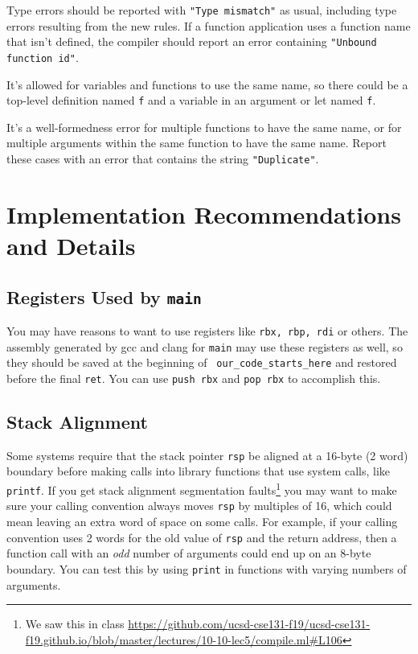 \documentclass[10pt, oneside]{article}
\begin{document}
Type errors should be reported with {\tt "Type mismatch"} as usual, including
type errors resulting from the new rules. If a function application uses a
function name that isn't defined, the compiler should report an error
containing {\tt "Unbound function id"}.

It's allowed for variables and functions to use the same name, so there could
be a top-level definition named {\tt f} and a variable in an argument or let
named {\tt f}.

It's a well-formedness error for multiple functions to have the same name, or
for multiple arguments within the same function to have the same name. Report
these cases with an error that contains the string {\tt "Duplicate"}.

\section*{Implementation Recommendations and Details}

\subsection*{Registers Used by {\tt main}}

You may have reasons to want to use registers like {\tt rbx, rbp, rdi} or
others. The assembly generated by gcc and clang for {\tt main} may use these
registers as well, so they should be saved at the beginning of {\tt
our\_code\_starts\_here} and restored before the final {\tt ret}. You can use
{\tt push rbx} and {\tt pop rbx} to accomplish this.

\subsection*{Stack Alignment}

Some systems require that the stack pointer {\tt rsp} be aligned at a 16-byte
(2 word) boundary before making calls into library functions that use system
calls, like {\tt printf}. If you get stack alignment segmentation
faults\footnote{We saw this in class
\url{https://github.com/ucsd-cse131-f19/ucsd-cse131-f19.github.io/blob/master/lectures/10-10-lec5/compile.ml\#L106}}
you may want to make sure your calling convention always moves {\tt rsp} by
multiples of 16, which could mean leaving an extra word of space on some
calls. For example, if your calling convention uses 2 words for the old value
of {\tt rsp} and the return address, then a function call with an {\it odd}
number of arguments could end up on an 8-byte boundary. You can test this by
using {\tt print} in functions with varying numbers of arguments.
\end{document}
